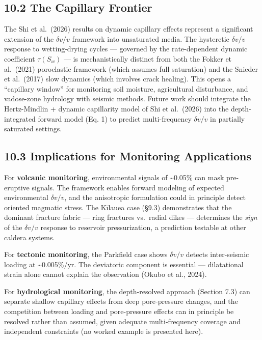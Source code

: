 \documentclass[12pt]{article}
\begin{document}
\subsection{10.2 The Capillary Frontier}\label{the-capillary-frontier}

The Shi et al.~(2026) results on dynamic capillary effects represent a
significant extension of the \(\delta v/v\) framework into unsaturated
media. The hysteretic \(\delta v/v\) response to wetting-drying cycles
--- governed by the rate-dependent dynamic coefficient \(\tau(S_w)\) ---
is mechanistically distinct from both the Fokker et al.~(2021)
poroelastic framework (which assumes full saturation) and the Snieder et
al.~(2017) slow dynamics (which involves crack healing). This opens a
``capillary window'' for monitoring soil moisture, agricultural
disturbance, and vadose-zone hydrology with seismic methods. Future work
should integrate the Hertz-Mindlin + dynamic capillarity model of Shi et
al.~(2026) into the depth-integrated forward model (Eq. 1) to predict
multi-frequency \(\delta v/v\) in partially saturated settings.

\subsection{10.3 Implications for Monitoring
Applications}\label{implications-for-monitoring-applications}

For \textbf{volcanic monitoring}, environmental signals of
\textasciitilde{}0.05\% can mask pre-eruptive signals. The framework
enables forward modeling of expected environmental \(\delta v/v\), and
the anisotropic formulation could in principle detect oriented magmatic
stress. The Kīlauea case (§9.3) demonstrates that the dominant fracture
fabric --- ring fractures vs.~radial dikes --- determines the
\emph{sign} of the \(\delta v/v\) response to reservoir pressurization,
a prediction testable at other caldera systems.

For \textbf{tectonic monitoring}, the Parkfield case shows
\(\delta v/v\) detects inter-seismic loading at
\textasciitilde{}0.005\%/yr. The deviatoric component is essential ---
dilatational strain alone cannot explain the observation (Okubo et al.,
2024).

For \textbf{hydrological monitoring}, the depth-resolved approach
(Section 7.3) can separate shallow capillary effects from deep
pore-pressure changes, and the competition between loading and
pore-pressure effects can in principle be resolved rather than assumed,
given adequate multi-frequency coverage and independent constraints (no
worked example is presented here).
\end{document}
